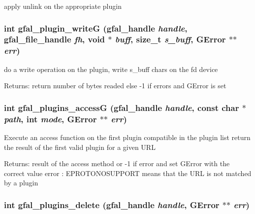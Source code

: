 apply unlink on the appropriate plugin 
\subsubsection{\setlength{\rightskip}{0pt plus 5cm}int gfal\_\-plugin\_\-write\-G (gfal\_\-handle {\em handle}, gfal\_\-file\_\-handle {\em fh}, void $\ast$ {\em buff}, size\_\-t {\em s\_\-buff}, GError $\ast$$\ast$ {\em err})}\label{gfal__common__plugin_8h_caaf6298a84f453bb6ddd50c36b6dfd7}


do a write operation on the plugin, write s\_\-buff chars on the fd device \begin{Desc}
\item[Returns:]return number of bytes readed else -1 if errors and GError is set \end{Desc}
\subsubsection{\setlength{\rightskip}{0pt plus 5cm}int gfal\_\-plugins\_\-access\-G (gfal\_\-handle {\em handle}, const char $\ast$ {\em path}, int {\em mode}, GError $\ast$$\ast$ {\em err})}\label{gfal__common__plugin_8h_b59f407ec7865163a60faaa56cbae432}


Execute an access function on the first plugin compatible in the plugin list return the result of the first valid plugin for a given URL \begin{Desc}
\item[Returns:]result of the access method or -1 if error and set GError with the correct value error : EPROTONOSUPPORT means that the URL is not matched by a plugin \end{Desc}
\subsubsection{\setlength{\rightskip}{0pt plus 5cm}int gfal\_\-plugins\_\-delete (gfal\_\-handle {\em handle}, GError $\ast$$\ast$ {\em err})}\label{gfal__common__plugin_8h_592f77dab6aa1a1e206f2cac7bf9ce3e}



